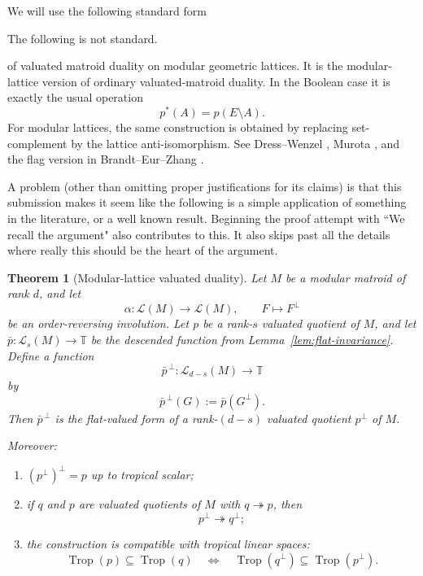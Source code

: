 \documentclass[12pt]{article}
\newcommand{\Trop}{\operatorname{Trop}}
\newcommand{\cL}{\mathcal L}
\theoremstyle{plain}
\newtheorem{theorem}{Theorem}[section]
\theoremstyle{definition}
\newcommand{\review}[1]{\begin{reviewbox}#1\end{reviewbox}}
\begin{document}
We will use the following standard form 
\review{The following is not standard.}
of valuated matroid duality on modular geometric lattices.  It is the modular-lattice version of ordinary valuated-matroid duality.  In the Boolean case it is exactly the usual operation
\[
   p^*(A)=p(E\setminus A).
\]
For modular lattices, the same construction is obtained by replacing set-complement by the lattice anti-isomorphism.  See Dress--Wenzel \cite{DW}, Murota \cite[Ch.~4]{Murota}, and the flag version in Brandt--Eur--Zhang \cite{BEZ}.

\review{A problem (other than omitting proper justifications for its claims) is that this submission makes it seem like the following is a simple application of something in the literature, or a well known result. Beginning the proof attempt with ``We recall the argument" also contributes to this. It also skips past all the details where really this should be the heart of the argument. }

\begin{theorem}[Modular-lattice valuated duality]\label{thm:modular-duality}
Let \(M\) be a modular matroid of rank \(d\), and let
\[
   \alpha:\cL(M)\longrightarrow \cL(M),\qquad F\longmapsto F^\perp
\]
be an order-reversing involution.  Let \(p\) be a rank-\(s\) valuated quotient of \(M\), and let \(\bar p:\cL_s(M)\to \mathbb T\) be the descended function from Lemma~\ref{lem:flat-invariance}.  Define a function
\[
   \bar p^{\,\perp}:\cL_{d-s}(M)\longrightarrow \mathbb T
\]
by
\[
   \bar p^{\,\perp}(G):=\bar p(G^\perp).
\]
Then \(\bar p^{\,\perp}\) is the flat-valued form of a rank-\((d-s)\) valuated quotient \(p^\perp\) of \(M\).

Moreover:
\begin{enumerate}[label=\textup{(\roman*)}]
\item \((p^\perp)^\perp=p\) up to tropical scalar;
\item if \(q\) and \(p\) are valuated quotients of \(M\) with \(q\twoheadrightarrow p\), then
\[
   p^\perp\twoheadrightarrow q^\perp;
\]
\item the construction is compatible with tropical linear spaces:
\[
   \Trop(p)\subseteq \Trop(q)
   \quad\Longleftrightarrow\quad
   \Trop(q^\perp)\subseteq \Trop(p^\perp).
\]
\end{enumerate}
\end{theorem}
\end{document}
